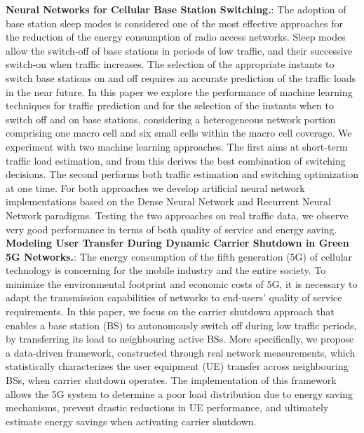 \textbf{Neural Networks for Cellular Base Station Switching\cite{Donevski2019}.}: The adoption of base station sleep modes is considered one of the most effective approaches for the reduction of the energy consumption of radio access networks. Sleep modes allow the switch-off of base stations in periods of low traffic, and their successive switch-on when traffic increases. The selection of the appropriate instants to switch base stations on and off requires an accurate prediction of the traffic loads in the near future. In this paper we explore the performance of machine learning techniques for traffic prediction and for the selection of the instants when to switch off and on base stations, considering a heterogeneous network portion comprising one macro cell and six small cells within the macro cell coverage. We experiment with two machine learning approaches. The first aims at short-term traffic load estimation, and from this derives the best combination of switching decisions. The second performs both traffic estimation and switching optimization at one time. For both approaches we develop artificial neural network implementations based on the Dense Neural Network and Recurrent Neural Network paradigms. Testing the two approaches on real traffic data, we observe very good performance in terms of both quality of service and energy saving.\\


\textbf{Modeling User Transfer During Dynamic Carrier Shutdown in Green 5G Networks\cite{user_transfer_5g}.}: The energy consumption of the fifth generation (5G) of cellular technology is concerning for the mobile industry and the entire society. To minimize the environmental footprint and economic costs of 5G, it is necessary to adapt the transmission capabilities of networks to end-users’ quality of service requirements. In this paper, we focus on the carrier shutdown approach that enables a base station (BS) to autonomously switch off during low traffic periods, by transferring its load to neighbouring active BSs. More specifically, we propose a data-driven framework, constructed through real network measurements, which statistically characterizes the user equipment (UE) transfer across neighbouring BSs, when carrier shutdown operates. The implementation of this framework allows the 5G system to determine a poor load distribution due to energy saving mechanisms, prevent drastic reductions in UE performance, and ultimately estimate energy savings when activating carrier shutdown.\\



